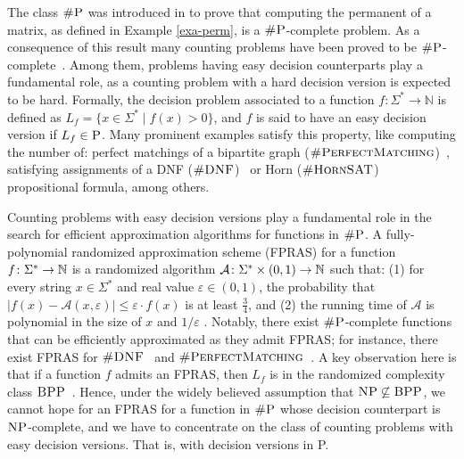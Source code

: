 
The class $\text{\sc \#P}$ was introduced in \cite{Valiant79} to prove that computing the permanent of a matrix, as defined in Example \ref{exa-perm}, is a $\text{\sc \#P}$-complete problem.
As a consequence of this result many counting problems have been proved to be $\text{\sc \#P}$-complete~\cite{V79b,arora2009computational}.
Among them, problems having easy decision counterparts play a fundamental role, as a counting problem with a hard decision version is expected to be hard. Formally, the decision problem associated to a function $f\colon\Sigma^* \to \mathbb{N}$ is defined as $L_f = \{ x \in \Sigma^* \mid f(x) > 0 \}$, and $f$ is said to have an easy decision version if $L_f \in \text{\sc P}$. 
Many prominent examples satisfy this property, like computing the number of: perfect matchings of a bipartite graph ($\textsc{\#PerfectMatching}$)~\cite{Valiant79}, satisfying assignments of a DNF ($\textsc{\#DNF}$)~\cite{DHK05,KL83} or Horn ($\textsc{\#HornSAT}$)~\cite{V79b} propositional formula, among others.

Counting problems with easy decision versions play a fundamental role in the search for efficient approximation algorithms for functions in $\text{\sc \#P}$. 
A fully-polynomial randomized approximation scheme (FPRAS) for a function $f\colon \Sigma^* \to \mathbb{N}$ is a randomized algorithm $\mathcal{A} \colon \Sigma^* \times (0,1) \to \mathbb{N}$ such that: (1) for every string $x \in \Sigma^*$ and real value $\varepsilon \in (0,1)$, the probability that $|f(x) - \mathcal{A}(x,\varepsilon)| \leq \varepsilon \cdot f(x)$ is at least $\frac{3}{4}$, and (2) the running time of $\mathcal{A}$ is polynomial in the size of $x$ and $1/\varepsilon$ \cite{KL83}. 
Notably, there exist $\text{\sc \#P}$-complete functions that can be efficiently approximated as they admit FPRAS; for instance, there exist FPRAS for $\textsc{\#DNF}$~\cite{KL83} and $\textsc{\#PerfectMatching}$~\cite{JSV04}. 
A key observation here is that if a function $f$ admits an FPRAS, then $L_f$ is in the randomized complexity class $\text{\sc BPP}$~\cite{G77}.
Hence, under the widely believed assumption that  $\text{\sc NP} \not\subseteq \text{\sc BPP}$, we cannot hope for an FPRAS for a function in $\text{\sc \#P}$ whose decision counterpart is $\text{\sc NP}$-complete, and we have to concentrate on the class of counting problems with easy decision versions. That is, with decision versions in P.

